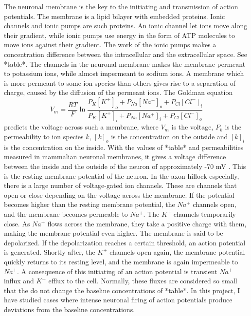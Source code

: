 \documentclass{article}
\begin{document}
The neuronal membrane is the key to the initiating and transmission of action potentials. The membrane is a lipid bilayer with embedded proteins. Ionic channels and ionic pumps are such proteins. An ionic channel let ions move along their gradient, while ionic pumps use energy in the form of ATP molecules to move ions against their gradient. The work of the ionic pumps makes a concentration difference between the intracellular and the extracellular space. See *table*. The  channels in the neuronal membrane makes the membrane permeant to potassium ions, while almost impermeant to sodium ions. A membrane which is more permeant to some ion species than others gives rise to a separation of charge, caused by the diffusion of the permeant ions. The Goldman equation 
\begin{equation}\label{eq:goldman}
V_m = \frac{RT}{F}\ln \frac{P_K[K^+]_o + P_{Na}[Na^+]_o + P_{Cl}[Cl^-]_{i}}{P_K[K^+]_i + P_{Na}[Na^+]_i + P_{Cl}[Cl^-]_{o}}
\end{equation}
predicts the voltage across such a membrane, where $V_m$ is the voltage, $P_k$ is the permeability to ion species $k$, $[k]_o$ is the concentration on the outside and $[k]_i$ is the concentration on the inside. With the values of *table* and permeabilities measured in mammalian neuronal membranes, it gives a voltage difference between the inside and the outside of the neuron of approximately -70 mV \cite{Neuroscience}. This is the resting membrane potential of the neuron. In the axon hillock especially, there is a large number of voltage-gated ion channels\cite{newworldencyclopedia}. These are channels that open or close depending on the voltage across the membrane. If the potential becomes higher than the resting membrane potential, the $Na^+$ channels open, and the membrane becomes permeable to $Na^+$. The $K^+$ channels temporarily close. As $Na^+$ flows across the membrane, they take a positive charge with them, making the membrane potential even higher. The membrane is said to be depolarized. If the depolarization reaches a certain threshold, an action potential is generated. Shortly after, the $K^+$ channels open again, the membrane potential quickly returns to its resting level, and the membrane is again impermeable to $Na^+$. A consequence of this initiating of an action potential is transient $Na^+$ influx and $K^+$ efflux to the cell. Normally, these fluxes are considered so small that the do not change the baseline concentrations of *table*. In this project, I have studied cases where intense neuronal firing of action potentials produce deviations from the baseline concentrations. 
\end{document}
